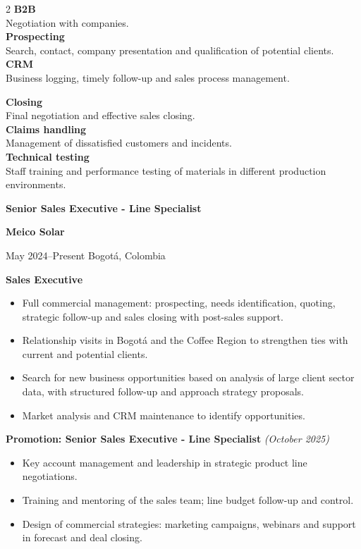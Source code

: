 \documentclass[10pt,a4paper]{altacv}
\renewcommand{\cvevent}[4]{%
  {\large\bfseries\color{emphasis}#1\par}
  \smallskip
  \textbf{\color{accent}#2}\par
  \smallskip
  {\small\faCalendar \hspace{0.5em}#3\hspace{2em}%
  \ifstrequal{#4}{}{}{\faMapMarker\hspace{0.5em}#4}\par}
  \medskip
}
\begin{document}
\vspace{0.3cm}
\begin{multicols}{2}
\small
\textbf{\color{accent}B2B}\\
Negotiation with companies.\\[4pt]
\textbf{\color{accent}Prospecting}\\
Search, contact, company presentation and qualification of potential clients.\\[4pt]
\textbf{\color{accent}CRM}\\
Business logging, timely follow-up and sales process management.

\columnbreak

\textbf{\color{accent}Closing}\\
Final negotiation and effective sales closing.\\[4pt]
\textbf{\color{accent}Claims handling}\\
Management of dissatisfied customers and incidents.\\[4pt]
\textbf{\color{accent}Technical testing}\\
Staff training and performance testing of materials in different production environments.
\end{multicols}

\cvevent{Senior Sales Executive - Line Specialist}{Meico Solar}{May 2024--Present}{Bogotá, Colombia}
{\color{accent}\textbf{Sales Executive}}
\begin{itemize}
\item Full commercial management: prospecting, needs identification, quoting, strategic follow-up and sales closing with post-sales support.
\item Relationship visits in Bogotá and the Coffee Region to strengthen ties with current and potential clients.
\item Search for new business opportunities based on analysis of large client sector data, with structured follow-up and approach strategy proposals.
\item Market analysis and CRM maintenance to identify opportunities.
\end{itemize}

{\color{accent}\textbf{Promotion: Senior Sales Executive - Line Specialist}} {\small\textit{(October 2025)}}
\begin{itemize}
\item Key account management and leadership in strategic product line negotiations.
\item Training and mentoring of the sales team; line budget follow-up and control.
\item Design of commercial strategies: marketing campaigns, webinars and support in forecast and deal closing.
\end{itemize}
\end{document}
